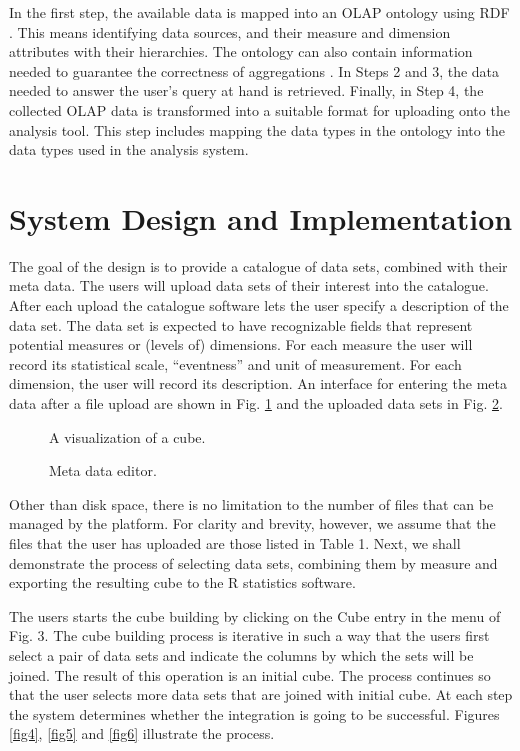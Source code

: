 \documentclass[USenglish,twocolumn]{article}
\begin{document}
In the first step, the available data is mapped into an OLAP ontology
using RDF \cite{Nie07}. This means identifying data sources, and their measure and
dimension attributes with their hierarchies. The ontology can also
contain information needed to guarantee the correctness of aggregations \cite{Tap14}.
In Steps 2 and 3, the data needed to answer the user's query at hand
is retrieved. Finally, in Step 4, the collected OLAP data is transformed
into a suitable format for uploading onto the analysis tool. This step
includes mapping the data types in the ontology into the data types used
in the analysis system.


\section{System Design and Implementation}

The goal of the design is to
provide a catalogue of data sets, combined with their meta data. The
users will upload data sets of their interest into the catalogue. After
each upload the catalogue software lets the user specify a description
of the data set. The data set is expected to have recognizable fields
that represent potential measures or (levels of) dimensions. For each
measure the user will record its statistical scale, ``eventness'' and
unit of measurement. For each dimension, the user will record its
description. An interface for entering the meta data after a file upload
are shown in Fig. \ref{fig2} and the uploaded data sets in Fig. \ref{fig3}.

\begin{figure}
\caption{A visualization of a cube.\label{fig2}}
\end{figure}

\begin{figure}
\caption{Meta data editor.\label{fig3}}
\end{figure}

Other than disk space, there is no limitation to the number of files
that can be managed by the platform. For clarity and brevity, however,
we assume that the files that the user has uploaded are those listed in
Table 1. Next, we shall demonstrate the process of selecting data sets,
combining them by measure and exporting the resulting cube to the R
statistics software.

The users starts the cube building by clicking on the Cube entry in the
menu of Fig. 3. The cube building process is iterative in such a way
that the users first select a pair of data sets and indicate the columns
by which the sets will be joined. The result of this operation is an
initial cube. The process continues so that the user selects more data
sets that are joined with initial cube. At each step the system
determines whether the integration is going to be successful. Figures
\ref{fig4}, \ref{fig5} and \ref{fig6} illustrate the process.
\end{document}
